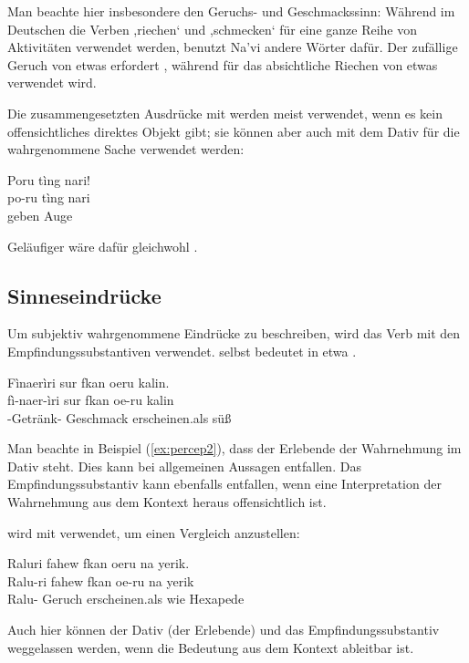 \noindent Man beachte hier insbesondere den Geruchs- und Geschmackssinn: Während im Deutschen die Verben ,riechen‘ und ,schmecken‘ für eine ganze Reihe von Aktivitäten verwendet werden, benutzt Na'vi andere Wörter dafür. Der zufällige Geruch von etwas erfordert , während für das absichtliche Riechen von etwas  verwendet wird.

Die zusammengesetzten Ausdrücke mit  werden meist verwendet, wenn es kein offensichtliches direktes Objekt gibt; sie können aber auch mit dem Dativ für die wahrgenommene Sache verwendet werden:

\begin{interlin}
	\glll \Npawl{}Poru tìng nari! \\
	po-ru tìng nari \\
	 geben Auge \\
\end{interlin}

\noindent Geläufiger wäre dafür gleichwohl .

\subsection{Sinneseindrücke}   
Um subjektiv wahrgenommene Eindrücke zu beschreiben, wird das Verb  mit den Empfindungssubstantiven verwendet.  selbst bedeutet in etwa .

\begin{interlin} \label{ex:percep2}
	\glll \Npawl{}Fìnaerìri sur fkan oeru kalin. \\
    fì-naer-ìri sur fkan oe-ru kalin \\
  	-Getränk- Geschmack erscheinen.als  süß \\
\end{interlin}

\noindent Man beachte in Beispiel (\ref{ex:percep2}), dass der Erlebende der Wahrnehmung im Dativ steht. Dies kann bei allgemeinen Aussagen entfallen. Das Empfindungssubstantiv kann ebenfalls entfallen, wenn eine Interpretation der Wahrnehmung aus dem Kontext heraus offensichtlich ist.

 wird mit   verwendet, um einen Vergleich anzustellen:

\begin{interlin}
\glll \Npawl{}Raluri fahew fkan oeru na yerik. \\
    Ralu-ri fahew fkan oe-ru na yerik \\
    Ralu- Geruch erscheinen.als  wie Hexapede \\
\end{interlin}

\noindent Auch hier können der Dativ (der Erlebende) und das Empfindungssubstantiv weggelassen werden, wenn die Bedeutung aus dem Kontext ableitbar ist.
